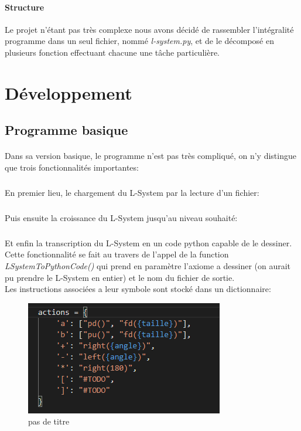 \documentclass{report}
\begin{document}
		\paragraph{Structure}
			Le projet n’étant pas très complexe nous avons décidé de rassembler l’intégralité programme dans un seul fichier, nommé \emph{l-system.py}, et de le décomposé en plusieurs fonction effectuant chacune une tâche particulière.
	\section{Développement}
		\subsection{Programme basique}
			\paragraph{} Dans sa version basique, le programme n'est pas très compliqué, on n'y distingue que trois fonctionnalités importantes:
			\subparagraph{}
				En premier lieu, le chargement du L-System par la lecture d'un fichier:
			
			\subparagraph{}
				Puis ensuite la croissance du L-System jusqu'au niveau souhaité:
				
			\subparagraph{}
				Et enfin la transcription du L-System en un code python capable de le dessiner. Cette fonctionnalité se fait au travers de l'appel de la function \emph{LSystemToPythonCode()} qui prend en paramètre l'axiome a dessiner (on aurait pu prendre le L-System en entier) et le nom du fichier de sortie. \\
				
				Les instructions associées a leur symbole sont stocké dans un dictionnaire:
				
			\begin{figure}[h]
				\begin{center}			
					\includegraphics[scale=0.70]{images/action_switcher.PNG}
					\caption{pas de titre}
				\end{center}
			\end{figure}	
			
\end{document}
